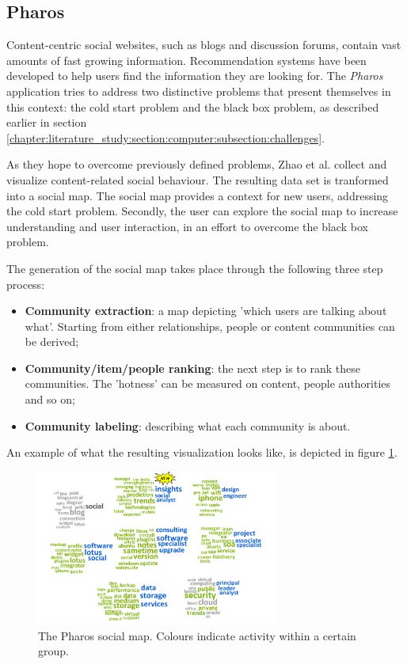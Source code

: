 \subsection{Pharos}\label{chapter:survey:section:applications:subsection:pharos}

Content-centric social websites, such as blogs and discussion forums, contain vast amounts of fast growing information. Recommendation systems have been developed to help users find the information they are looking for. The \emph{Pharos} application tries to address two distinctive problems that present themselves in this context: the cold start problem and the black box problem\cite{zhao:2010}, as described earlier in section \ref{chapter:literature_study:section:computer:subsection:challenges}.

As they hope to overcome previously defined problems, Zhao et al. \cite{zhao:2010} collect and visualize content-related social behaviour. The resulting data set is tranformed into a social map. The social map provides a context for new users, addressing the cold start problem. Secondly, the user can explore the social map to increase understanding and user interaction, in an effort to overcome the black box problem.

The generation of the social map takes place through the following three step process:

\begin{itemize}
	\item \textbf{Community extraction}: a map depicting 'which users are talking about what'. Starting from either relationships, people or content communities can be derived;
	\item \textbf{Community/item/people ranking}: the next step is to rank these communities. The 'hotness' can be measured on content, people authorities and so on;
	\item \textbf{Community labeling}: describing what each community is about.
\end{itemize}

An example of what the resulting visualization looks like, is depicted in figure \ref{figure:pharos}.

\begin{figure}%
	\begin{center}
		\includegraphics[width=300px]{img/pharos}%
	\end{center}
	\caption{The Pharos social map. Colours indicate activity within a certain group.}%
	\label{figure:pharos}%
\end{figure}




